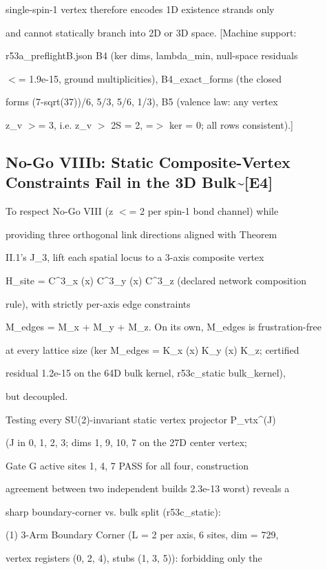 \documentclass[11pt,a4paper]{article}
\theoremstyle{definition}
\begin{document}
single-spin-1 vertex therefore encodes 1D existence strands only

and cannot statically branch into 2D or 3D space. [Machine support:

r53a\_preflightB.json B4 (ker dims, lambda\_min, null-space residuals

$<$= 1.9e-15, ground multiplicities), B4\_exact\_forms (the closed

forms (7-sqrt(37))/6, 5/3, 5/6, 1/3), B5 (valence law: any vertex

z\_v $>$= 3, i.e. z\_v $>$ 2S = 2, =$>$ ker = {0}; all rows consistent).]


\subsection{No-Go VIIIb: Static Composite-Vertex Constraints Fail in the 3D Bulk\textasciitilde{}[\textsc{E4}]}

To respect No-Go VIII (z $<$= 2 per spin-1 bond channel) while

providing three orthogonal link directions aligned with Theorem

II.1's J\_3, lift each spatial locus to a 3-axis composite vertex

H\_site = C\^{}3\_x (x) C\^{}3\_y (x) C\^{}3\_z (declared network composition

rule), with strictly per-axis edge constraints

M\_edges = M\_x + M\_y + M\_z. On its own, M\_edges is frustration-free

at every lattice size (ker M\_edges = K\_x (x) K\_y (x) K\_z; certified

residual 1.2e-15 on the 64D bulk kernel, r53c\_static bulk\_kernel),

but decoupled.


Testing every SU(2)-invariant static vertex projector P\_vtx\^{}{(J)}

(J in {0, 1, 2, 3}; dims 1, 9, 10, 7 on the 27D center vertex;

Gate G active sites {1, 4, 7} PASS for all four, construction

agreement between two independent builds 2.3e-13 worst) reveals a

sharp boundary-corner vs. bulk split (r53c\_static):


(1) 3-Arm Boundary Corner (L = 2 per axis, 6 sites, dim = 729,

vertex registers (0, 2, 4), stubs (1, 3, 5)): forbidding only the
\end{document}
